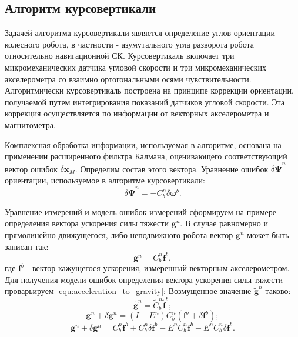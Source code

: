 \documentclass[14pt]{article}
\begin{document}
\subsection{Алгоритм курсовертикали}
Задачей алгоритма курсовертикали  является определение углов ориентации колесного робота, в частности - азумутального угла разворота робота относительно навигационной СК.
Курсовертикаль включает три микромеханических датчика угловой скорости и три микромеханических акселерометра со взаимно ортогональными осями чувствительности.
Алгоритмически курсовертикаль построена на принципе коррекции ориентации, получаемой путем интегрирования  показаний датчиков угловой скорости.
Эта коррекция осуществляется по информации от векторных акселерометра и  магнитометра.

Комплексная обработка информации, используемая в алгоритме, основана на применении расширенного фильтра Калмана, оценивающего соответствующий вектор ошибок $\delta \boldsymbol x_M$. 
Определим состав  этого вектора. 
Уравнение ошибок $\delta\dot{\boldsymbol\Psi}^n$ ориентации, используемое в алгоритме курсовертикали:
\begin{equation}
 \delta\dot{\boldsymbol\Psi}^n = -C_b^n\delta\boldsymbol\omega^b.
\end{equation}

Уравнение измерений и модель ошибок измерений сформируем на примере определения вектора ускорения силы тяжести $\boldsymbol g^n$.
В случае равномерно и прямолинейно движущегося, либо неподвижного робота вектор $\boldsymbol g^n$ может быть записан так:
\begin{equation}\label{equ:acceleration_to_gravity}
\boldsymbol g^n = C_b^n \boldsymbol f^b,
\end{equation}
где $\boldsymbol f^b$ - вектор кажущегося ускорения, измеренный векторным акселерометром.
Для получения модели ошибок определения вектора ускорения силы тяжести проварьируем \eqref{equ:acceleration_to_gravity}:
Возмущенное значение $\tilde{\boldsymbol g}^n$ таково:
\begin{equation}
\boldsymbol{\tilde g}^n = \tilde{C}_b^n \tilde{\boldsymbol f}^b;
\end{equation}
\begin{equation}
\boldsymbol g^n + \delta \boldsymbol g^n = \left(I-E^n\right)C_b^n\left(\boldsymbol f^b+\delta\boldsymbol f^b\right);
\end{equation}
\begin{equation}\label{equ:acceleration_to_gravity_errors_raw}
\boldsymbol g^n + \delta \boldsymbol g^n = C_b^n \boldsymbol f^b + C_b^n \delta\boldsymbol f^b -  E^n C_b^n \boldsymbol f^b -E^nC_b^n  \delta\boldsymbol f^b.
\end{equation}
\end{document}
